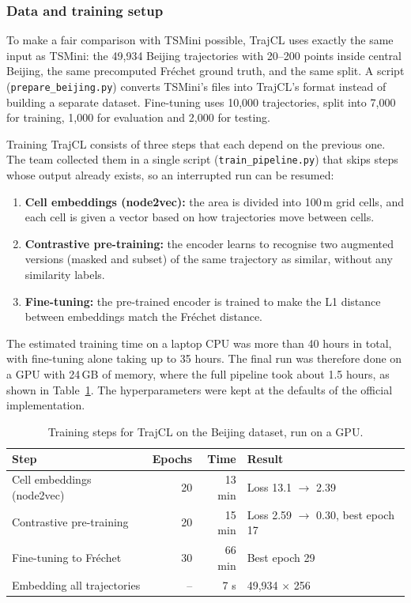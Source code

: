 \subsubsection*{Data and training setup}

To make a fair comparison with TSMini possible, TrajCL uses exactly the same input as TSMini: the 49{,}934 Beijing trajectories with 20--200 points inside central Beijing, the same precomputed Fréchet ground truth, and the same split. A script (\texttt{prepare\_beijing.py}) converts TSMini's files into TrajCL's format instead of building a separate dataset. Fine-tuning uses 10{,}000 trajectories, split into 7{,}000 for training, 1{,}000 for evaluation and 2{,}000 for testing.

Training TrajCL consists of three steps that each depend on the previous one. The team collected them in a single script (\texttt{train\_pipeline.py}) that skips steps whose output already exists, so an interrupted run can be resumed:

\begin{enumerate}
    \item \textbf{Cell embeddings (node2vec):} the area is divided into 100\,m grid cells, and each cell is given a vector based on how trajectories move between cells.
    \item \textbf{Contrastive pre-training:} the encoder learns to recognise two augmented versions (masked and subset) of the same trajectory as similar, without any similarity labels.
    \item \textbf{Fine-tuning:} the pre-trained encoder is trained to make the L1 distance between embeddings match the Fréchet distance.
\end{enumerate}

The estimated training time on a laptop CPU was more than 40 hours in total, with fine-tuning alone taking up to 35 hours. The final run was therefore done on a GPU with 24\,GB of memory, where the full pipeline took about 1.5 hours, as shown in Table~\ref{tab:trajcl-training-time}. The hyperparameters were kept at the defaults of the official implementation.

\begin{table}[H]
    \centering
    \begin{tabular}{lrrl}
        \hline
        \textbf{Step} & \textbf{Epochs} & \textbf{Time} & \textbf{Result} \\
        \hline
        Cell embeddings (node2vec) & 20 & 13 min & Loss 13.1 $\rightarrow$ 2.39 \\
        Contrastive pre-training   & 20 & 15 min & Loss 2.59 $\rightarrow$ 0.30, best epoch 17 \\
        Fine-tuning to Fréchet     & 30 & 66 min & Best epoch 29 \\
        Embedding all trajectories & --  & 7 s    & 49{,}934 $\times$ 256 \\
        \hline
    \end{tabular}
    \caption{Training steps for TrajCL on the Beijing dataset, run on a GPU.}
    \label{tab:trajcl-training-time}
\end{table}

